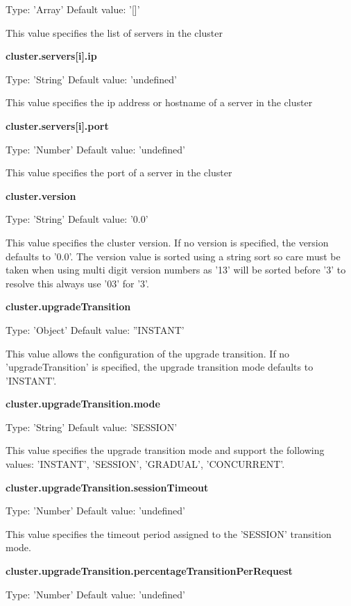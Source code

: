 \documentclass[a4paper,11pt,twoside]{report}
\begin{document}
	\noindent
Type: 'Array'  Default value: '[]'\smallskip

\noindent
This value specifies the list of servers in the cluster\bigskip

\noindent
\textbf{cluster.servers[i].ip}

\noindent
Type: 'String' Default value: 'undefined'\smallskip

\noindent
This value specifies the ip address or hostname of a server in the cluster\bigskip

\noindent
\textbf{cluster.servers[i].port}

\noindent
Type: 'Number' Default value: 'undefined'\smallskip

\noindent
This value specifies the port of a server in the cluster\bigskip

\noindent
\textbf{cluster.version}

\noindent
Type: 'String' Default value: '0.0'\smallskip

\noindent
This value specifies the cluster version. If no version is specified, the version defaults to '0.0'.  The version value is sorted using a string sort so care must be taken when using multi digit version numbers as '13' will be sorted before '3' to resolve this always use '03' for '3'. \bigskip

\noindent
\textbf{cluster.upgradeTransition}

\noindent
Type: 'Object' Default value: ''INSTANT'\smallskip

\noindent
This value allows the configuration of the upgrade transition. If no 'upgradeTransition' is specified, the upgrade transition mode defaults to 'INSTANT'.\bigskip

\noindent
\textbf{cluster.upgradeTransition.mode}

\noindent
Type: 'String' Default value: 'SESSION'\smallskip

\noindent
This value specifies the upgrade transition mode and support the following values: 'INSTANT', 'SESSION', 'GRADUAL', 'CONCURRENT'.\bigskip

\noindent
\textbf{cluster.upgradeTransition.sessionTimeout}

\noindent
Type: 'Number' Default value: 'undefined'\smallskip

\noindent
This value specifies the timeout period assigned to the 'SESSION' transition mode. \bigskip

\noindent
\textbf{cluster.upgradeTransition.percentageTransitionPerRequest}

\noindent
Type: 'Number' Default value: 'undefined'\smallskip
\end{document}
